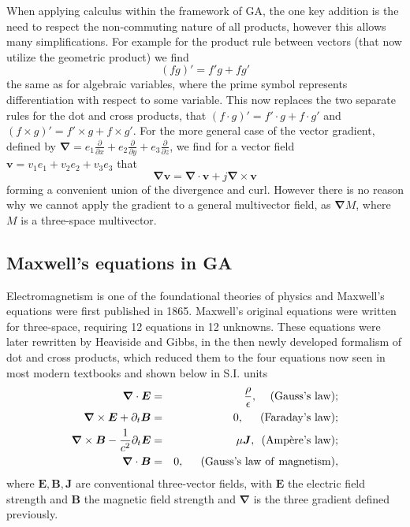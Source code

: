 \documentclass[prb,preprint]{revtex4}
\newcommand{\be}{\begin{equation}}
\newcommand{\ee}{\end{equation}}
\newcommand{\bea}{\begin{eqnarray}}
\newcommand{\eea}{\end{eqnarray}}
\newcommand{\iGA}{{j}}
\newcommand{\ex}{{e_1}}
\newcommand{\ey}{{e_2}}
\newcommand{\ez}{{e_3}}
\begin{document}
When applying calculus within the framework of GA, the one key addition is the need to respect the non-commuting nature of all products, however this allows many simplifications.
For example for the product rule between vectors (that now utilize the geometric product) we find
\be
(f g)' = f' g + f g'
\ee
the same as for algebraic variables, where the prime symbol represents differentiation with respect to some variable.  This now  replaces the two separate rules for the dot and cross products, that $ (f \cdot g)' = f' \cdot g + f \cdot g' $ and $ (f \times g)' = f' \times g + f \times g' $.
For the more general case of the vector gradient, defined by $ \boldsymbol{\nabla} = \ex \frac{\partial}{\partial x} + \ey \frac{\partial}{\partial y} + \ez \frac{\partial}{\partial z} $, we find for a vector field $ \boldsymbol{v} = v_1 e_1 + v_2 e_2 + v_3 e_3 $ that
\be
\boldsymbol{\nabla} \boldsymbol{v} = \boldsymbol{\nabla} \cdot \boldsymbol{v} + \iGA \boldsymbol{\nabla} \times \boldsymbol{v}
\ee
forming a convenient union of the divergence and curl.  However there is no reason why we cannot apply the gradient to a general multivector field, as $ \boldsymbol{\nabla} M $, where $ M $ is a three-space multivector.


\subsection{Maxwell's equations in GA}

Electromagnetism is one of the foundational theories of physics and Maxwell's equations \cite{Maxwell:1865} were first published in 1865.  Maxwell's original equations were written for three-space, requiring 12 equations in 12 unknowns. These equations were later rewritten by Heaviside and Gibbs, in the then newly developed formalism of dot and cross products, which reduced them to the four equations now seen in most modern textbooks  \cite{Griffiths:1999} and shown below in S.I. units
\bea \label{MaxwellClassical}
\boldsymbol{\nabla} \cdot \boldsymbol{E} & = & \frac{\rho}{\epsilon},   \,\,\,\,\,\,\, \rm{(Gauss\text{'}s \,\, law)} ; \\ \nonumber
\boldsymbol{\nabla} \times \boldsymbol{E} +  \partial_t \boldsymbol{B}  & = &  0 , \,\,\,\,\,\,\,\,\, \rm{(Faraday\text{'}s \,\, law)} ; \\ \nonumber
\boldsymbol{\nabla} \times \boldsymbol{B} - \frac{1}{c^2} \partial_t \boldsymbol{E} & = & \mu \boldsymbol{J},  \,\,\,  \rm{(Amp\grave{e}re\text{'}s \,\, law)} ; \\ \nonumber
\boldsymbol{\nabla} \cdot \boldsymbol{B}  & = &  0 , \,\,\,  \,\,\,  \,\,\,  \rm{(Gauss\text{'}s \,\, law \,\, of \,\, magnetism)} ,   \nonumber
\eea
where $ \boldsymbol{E}, \boldsymbol{B}, \boldsymbol{J} $ are conventional three-vector fields, with $ \boldsymbol{E} $  the electric field strength and $ \boldsymbol{B} $ the magnetic field strength and $ \boldsymbol{\nabla} $ is the three gradient defined previously.
\end{document}
